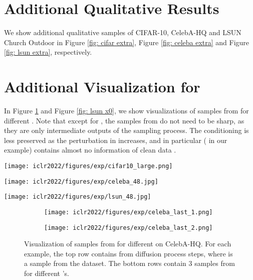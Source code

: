 \section{Additional Qualitative Results} \label{app: extra sample}
We show additional qualitative samples of CIFAR-10, CelebA-HQ and LSUN Church Outdoor in Figure \ref{fig: cifar extra}, Figure \ref{fig: celeba extra} and Figure \ref{fig: lsun extra}, respectively.

\section{Additional Visualization for } \label{app: x0 visualization}
In Figure \ref{fig: celeba x0} and Figure \ref{fig: lsun x0}, we show visualizations of samples from  for different . Note that except for , the samples from  do not need to be sharp, as they are only intermediate outputs of the sampling process. The conditioning is less preserved as the perturbation in  increases, and in particular  ( in our example) contains almost no information of clean data .

\begin{figure*}[ht]
    \centering
    \texttt{[image: iclr2022/figures/exp/cifar10\_large.png]}
    \caption{\label{fig: cifar extra}
     Additional qualitative samples on CIFAR-10.}
\end{figure*}

\begin{figure*}[ht]
    \centering
    \texttt{[image: iclr2022/figures/exp/celeba\_48.jpg]}
    \caption{\label{fig: celeba extra}
     Additional qualitative samples on CelebA-HQ.}
\end{figure*}

\begin{figure*}[ht]
    \centering
    \texttt{[image: iclr2022/figures/exp/lsun\_48.jpg]}
    \caption{\label{fig: lsun extra}
     Additional qualitative samples on LSUN Church Outdoor.}
\end{figure*}


\begin{figure}[h]
    \begin{subfigure}{.99\linewidth}
    \centering
    \texttt{[image: iclr2022/figures/exp/celeba\_last\_1.png]}
    \end{subfigure} \begin{subfigure}{.99\linewidth}
    \centering
    \texttt{[image: iclr2022/figures/exp/celeba\_last\_2.png]}
\end{subfigure}
\caption{Visualization of samples from  for different  on CelebA-HQ. For each example, the top row contains  from diffusion process steps, where  is a sample from the dataset. The bottom rows contain 3 samples from  for different 's.}\label{fig: celeba x0}
\end{figure}


